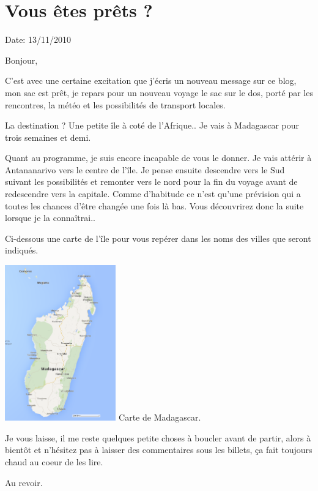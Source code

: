 \section{Vous êtes prêts ?}

Date: 13/11/2010

\begin{multicols}{2}

Bonjour,

C'est avec une certaine excitation que j'écris un nouveau message sur ce blog, mon sac est prêt, je repars pour un nouveau voyage le sac sur le dos, porté par les rencontres, la météo et les possibilités de transport locales.

La destination ? Une petite île à coté de l'Afrique.. Je vais à Madagascar pour trois semaines et demi.

Quant au programme, je suis encore incapable de vous le donner. Je vais attérir à Antananarivo vers le centre de l'île. Je pense ensuite descendre vers le Sud suivant les possibilités et remonter vers le nord pour la fin du voyage avant de redescendre vers la capitale. Comme d'habitude ce n'est qu'une prévision qui a toutes les chances d'être changée une fois là bas. Vous découvrirez donc la suite lorsque je la connaîtrai..

Ci-dessous une carte de l'île pour vous repérer dans les noms des villes que seront indiqués.

\hspace*{-0.65cm}
\includegraphics[width=4.8cm]{articles/Vous-etes-prets/madagascar.png}
Carte de Madagascar.

Je vous laisse, il me reste quelques petite choses à boucler avant de partir, alors à bientôt et n'hésitez pas à laisser des commentaires sous les billets, ça fait toujours chaud au coeur de les lire.

Au revoir.

\end{multicols}


